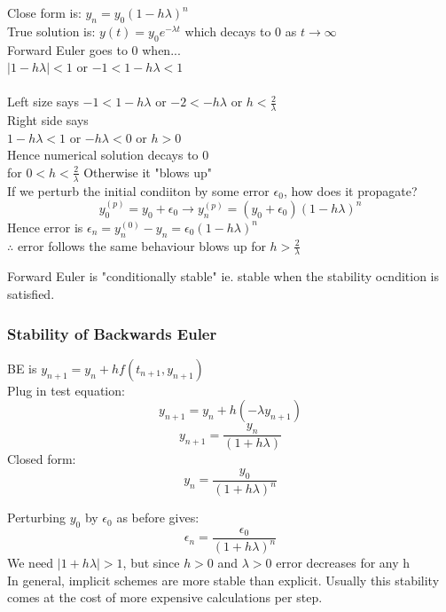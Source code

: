 \documentclass[12pt]{article}
\begin{document}
	Close form is: $y_n = y_0(1-h\lambda)^n$\\
	True solution is: $y(t) = y_0e^{-\lambda t}$ which decays to 0 as $t \rightarrow \infty$\\
	
	Forward Euler goes to 0 when...\\
	$|1-h\lambda| < 1$ or $-1 < 1-h\lambda < 1$\\\\
	
	Left size says $-1 < 1 - h\lambda$ or $-2 < -h\lambda$ or $h < \frac{2}{\lambda}$\\
	Right side says\\
	$1 - h\lambda < 1$ or $-h\lambda < 0$ or $h > 0$\\
	Hence numerical solution decays to 0\\
	for $0 < h < \frac{2}{\lambda}$ Otherwise it "blows up"\\
	
	If we perturb the initial condiiton by some error $\epsilon_0$, how does it propagate?\\
	$$y_0^{(p)} = y_0 + \epsilon_0 \rightarrow y_n^{(p)} = (y_0 + \epsilon_0)(1-h\lambda)^n$$
	Hence error is $\epsilon_n = y_n^{(0)} - y_n = \epsilon_0(1-h\lambda)^n$\\
	$\therefore$ error follows the same behaviour blows up for $h > \frac{2}{\lambda}$
	
	Forward Euler is "conditionally stable" ie. stable when the stability ocndition is satisfied.\\
	
	\subsubsection*{Stability of Backwards Euler}
	BE is $y_{n+1} = y_n + hf(t_{n+1}, y_{n+1})$\\
	Plug in test equation:\\
	$$y_{n+1} = y_n + h(-\lambda y_{n+1})$$
	$$y_{n+1} = \frac{y_n}{(1+h\lambda)}$$
	Closed form:
	$$y_n = \frac{y_0}{(1+h\lambda)^n}$$
	
	Perturbing $y_0$ by $\epsilon_0$ as before gives:\\
	$$\epsilon_n = \frac{\epsilon_0}{(1+h\lambda)^n}$$
	We need $|1 + h\lambda| > 1$, but since $h > 0$ and $\lambda > 0$ error decreases for any h\\
	
	In general, implicit schemes are more stable than explicit. Usually this stability comes at the cost of more expensive calculations per step.\\
	
\end{document}
